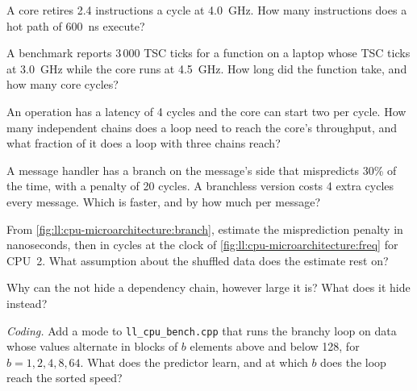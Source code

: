 \begin{exercise}[$\star$]\label{exo:ll:cpu-microarchitecture:1}
A core retires 2.4 instructions a cycle at 4.0~GHz. How many instructions does a hot path of \qty{600}{\nano\second}
execute?
\end{exercise}

\begin{exercise}[$\star$]\label{exo:ll:cpu-microarchitecture:2}
A benchmark reports 3\,000 TSC ticks for a function on a laptop whose TSC ticks at 3.0~GHz while the core runs at
4.5~GHz. How long did the function take, and how many core cycles?
\end{exercise}

\begin{exercise}[$\star$]\label{exo:ll:cpu-microarchitecture:3}
An operation has a latency of 4 cycles and the core can start two per cycle. How many independent chains does a loop
need to reach the core's throughput, and what fraction of it does a loop with three chains reach?
\end{exercise}

\begin{exercise}[$\star\star$]\label{exo:ll:cpu-microarchitecture:4}
A message handler has a branch on the message's side that mispredicts 30\% of the time, with a penalty of 20 cycles. A
branchless version costs 4 extra cycles every message. Which is faster, and by how much per message?
\end{exercise}

\begin{exercise}[$\star\star$]\label{exo:ll:cpu-microarchitecture:5}
From \cref{fig:ll:cpu-microarchitecture:branch}, estimate the misprediction penalty in nanoseconds, then in cycles at
the clock of \cref{fig:ll:cpu-microarchitecture:freq} for CPU~2. What assumption about the shuffled data does the
estimate rest on?
\end{exercise}

\begin{exercise}[$\star\star$]\label{exo:ll:cpu-microarchitecture:6}
Why can the  not hide a dependency chain, however large it is? What does it hide instead?
\end{exercise}

\begin{exercise}[$\star\star\star$]\label{exo:ll:cpu-microarchitecture:7}
\emph{Coding.} Add a mode to \texttt{ll\_cpu\_bench.cpp} that runs the branchy loop on data whose values alternate in
blocks of $b$ elements above and below 128, for $b = 1, 2, 4, 8, 64$. What does the predictor learn, and at which $b$
does the loop reach the sorted speed?
\end{exercise}

